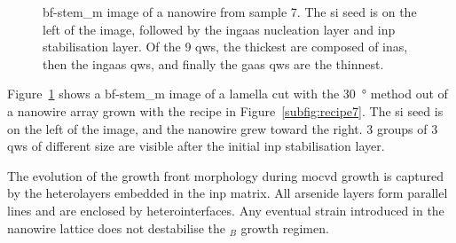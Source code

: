 \begin{figure}
    \centering
    \caption{\acs{bf}-\acs{stem_m} image of a nanowire from sample 7. The \acs{si} seed is on the left of the image, followed by the \acs{ingaas} nucleation layer and \acs{inp} stabilisation layer. Of the \num{9} \acl{qw}s, the thickest are composed of \acs{inas}, then the \acs{ingaas} \acl{qw}s, and finally the \acs{gaas} \acl{qw}s are the thinnest.}
    \label{fig:s7_OV}
\end{figure}

Figure~\ref{fig:s7_OV} shows a \acs{bf}-\acs{stem_m} image of a lamella cut with the \qty{30}{\degree} method out of a nanowire array grown with the recipe in Figure~\ref{subfig:recipe7}. The \acl{si} seed is on the left of the image, and the nanowire grew toward the right. \num{3} groups of \num{3} \acl{qw}s of different size are visible after the  initial \acs{inp} stabilisation layer.

The evolution of the growth front morphology during \acs{mocvd} growth is captured by the heterolayers embedded in the \acs{inp} matrix. All arsenide layers form parallel lines and are enclosed by  heterointerfaces. Any eventual strain introduced in the nanowire lattice does not destabilise the \(_B\) growth regimen.

